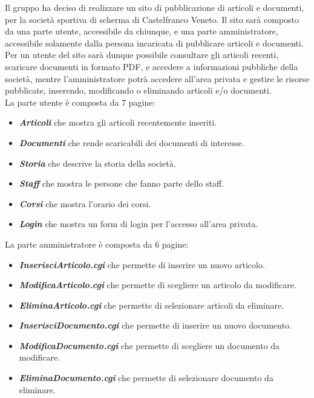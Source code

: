 Il gruppo ha deciso di realizzare un sito di pubblicazione di articoli e documenti, per la societ\`a sportiva di scherma di Castelfranco Veneto. Il sito sar\`a composto da una parte utente, accessibile da chiunque, e una parte amministratore, accessibile solamente dalla persona incaricata di pubblicare articoli e documenti. 
Per un utente del sito sar\`a dunque possibile consultare gli articoli recenti, scaricare documenti in formato PDF, e accedere a informazioni pubbliche della societ\`a, mentre l'amministratore potr\`a accedere all'area privata e gestire le risorse pubblicate, inserendo, modificando o eliminando articoli e/o documenti.\\

\noindent La parte utente \`e composta da 7 pagine:
\begin{itemize}
	\item {\bfseries\textit{Articoli}} che mostra gli articoli recentemente inseriti.
	\item {\bfseries\textit{Documenti}} che rende scaricabili dei documenti di interesse.
	\item {\bfseries\textit{Storia}} che descrive la storia della societ\`a.
	\item {\bfseries\textit{Staff}} che mostra le persone che fanno parte dello staff.
	\item {\bfseries\textit{Corsi}} che mostra l'orario dei corsi.
	\item {\bfseries\textit{Login}} che mostra un form di login per l'accesso all'area privata.
\end{itemize}
La parte amministratore \`e composta da 6 pagine:
\begin{itemize}
	\item {\bfseries\textit{InserisciArticolo.cgi}} che permette di inserire un nuovo articolo.
	\item {\bfseries\textit{ModificaArticolo.cgi}} che permette di scegliere un articolo da modificare.
	\item {\bfseries\textit{EliminaArticolo.cgi}} che permette di selezionare articoli da eliminare.
	\item {\bfseries\textit{InserisciDocumento.cgi}} che permette di inserire un nuovo documento.
	\item {\bfseries\textit{ModificaDocumento.cgi}} che permette di scegliere un documento da modificare.
	\item {\bfseries\textit{EliminaDocumento.cgi}} che permette di selezionare documento da eliminare.
\end{itemize}

